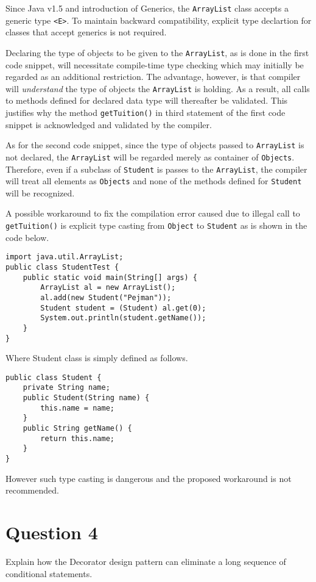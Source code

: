 Since Java v1.5 and introduction of Generics, the \texttt{ArrayList} class accepts a generic type \texttt{<E>}.
To maintain backward compatibility, explicit type declartion for classes that accept generics is not required.

Declaring the type of objects to be given to the \texttt{ArrayList}, as is done in the first code snippet, will necessitate compile-time type checking which may initially be regarded as an additional restriction.
The advantage, however, is that compiler will \textit{understand} the type of objects the \texttt{ArrayList} is holding.
As a result, all calls to methods defined for declared data type will thereafter be validated.
This justifies why the method \texttt{getTuition()} in third statement of the first code snippet is acknowledged and validated by the compiler.

As for the second code snippet, since the type of objects passed to \texttt{ArrayList} is not declared, the \texttt{ArrayList} will be regarded merely as container of \texttt{Objects}.
Therefore, even if a subclass of \texttt{Student} is passes to the \texttt{ArrayList}, the compiler will treat all elements as \texttt{Objects} and none of the methods defined for \texttt{Student} will be recognized.

A possible workaround to fix the compilation error caused due to illegal call to \texttt{getTuition()} is explicit type casting from \texttt{Object} to \texttt{Student} as is shown in the code below.

\begin{lstlisting}
import java.util.ArrayList;
public class StudentTest {
	public static void main(String[] args) {
		ArrayList al = new ArrayList();
		al.add(new Student("Pejman"));
		Student student = (Student) al.get(0);
		System.out.println(student.getName());
	}
}
\end{lstlisting}

Where Student class is simply defined as follows.

\begin{lstlisting}
public class Student {
	private String name;
	public Student(String name) {
		this.name = name;
	}
	public String getName() {
		return this.name;
	}
}
\end{lstlisting}

However such type casting is dangerous and the proposed workaround is not recommended.

\section{Question 4}
Explain how the Decorator design pattern can eliminate a long sequence of conditional statements.


